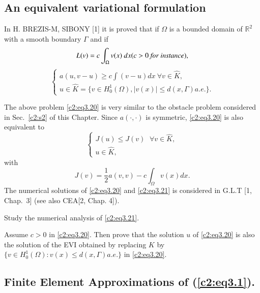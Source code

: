  \subsection{An equivalent variational 
formulation}\label{c2:ss3.4}%
 
 In H. BREZIS-M, SIBONY [1] it is proved that if $\Omega$ is a bounded 
 domain of $\mathbb{R}^2$ with a smooth boundary $\Gamma$ and if    
 $$
 L(v) = c \int_\Omega v (x) ~ dx (c > 0 ~\text{\em for instance}),
 $$
\begin{equation}
\begin{cases}
a (u, v - u) \geq c \int (v - u) dx ~\forall v \in \hat{K},\\
u \in \hat{K} = \{v \in H^1_0 (\Omega), | v (x) | \leq d (x,
\Gamma)  a.e. \}.\tag{3.20}\label{c2:eq3.20} 
\end{cases}
\end{equation} 
 
 The above problem \eqref{c2:eq3.20} is very similar to the obstacle problem
 considered in Sec.~\ref{c2:s2} of this Chapter. Since $a(\cdot , \cdot)$ is symmetric,
 \eqref{c2:eq3.20} is also equivalent to  
 \begin{equation}
\begin{cases}
J(u) \leq J(v) ~~\, \forall  v \in \hat{K},\\
u \in \hat{K}, \tag{3.21}\label{c2:eq3.21}
\end{cases}
\end{equation}\pageoriginale  
 with
 $$
 J (v) = \dfrac{1}{2} a (v, v) - c \int_\Omega v (x) dx.
 $$
 The numerical solutions of \eqref{c2:eq3.20} and \eqref{c2:eq3.21} is
 considered in G.L.T [1, Chap.~3] (see also CEA[2, Chap. 4]). 
 
\begin{exercise}%
Study the numerical analysis of \eqref{c2:eq3.21}.
\end{exercise} 
 
\begin{exercise}%
Assume $c > 0$ in \eqref{c2:eq3.20}. Then prove that the solution $u$ of \eqref{c2:eq3.20}
is also the solution of the EVI obtained by replacing $K$ by $\{v
\in H^1_0 (\Omega)  : v (x) \leq d (x, \Gamma) a.e. \}$ in
\eqref{c2:eq3.20}. 
 \end{exercise} 
 
\subsection{Finite Element Approximations of (\ref{c2:eq3.1}).}%
 

